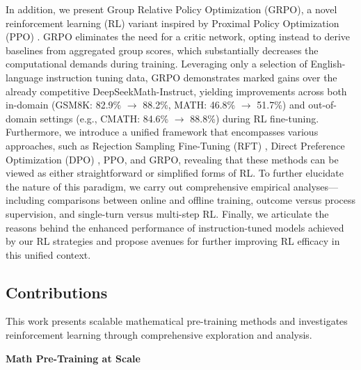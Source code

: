 In addition, we present Group Relative Policy Optimization (GRPO), a novel reinforcement learning (RL) variant inspired by Proximal Policy Optimization (PPO) \citep{schulman2017proximal}. GRPO eliminates the need for a critic network, opting instead to derive baselines from aggregated group scores, which substantially decreases the computational demands during training. Leveraging only a selection of English-language instruction tuning data, GRPO demonstrates marked gains over the already competitive DeepSeekMath-Instruct, yielding improvements across both in-domain (GSM8K: 82.9\% $\rightarrow$ 88.2\%, MATH: 46.8\% $\rightarrow$ 51.7\%) and out-of-domain settings (e.g., CMATH: 84.6\% $\rightarrow$ 88.8\%) during RL fine-tuning. Furthermore, we introduce a unified framework that encompasses various approaches, such as Rejection Sampling Fine-Tuning (RFT) \citep{yuan2023scaling}, Direct Preference Optimization (DPO) \citep{dpo}, PPO, and GRPO, revealing that these methods can be viewed as either straightforward or simplified forms of RL. To further elucidate the nature of this paradigm, we carry out comprehensive empirical analyses—including comparisons between online and offline training, outcome versus process supervision, and single-turn versus multi-step RL. Finally, we articulate the reasons behind the enhanced performance of instruction-tuned models achieved by our RL strategies and propose avenues for further improving RL efficacy in this unified context.

\subsection{Contributions}
This work presents scalable mathematical pre-training methods and investigates reinforcement learning through comprehensive exploration and analysis.

\textbf{Math Pre-Training at Scale}


